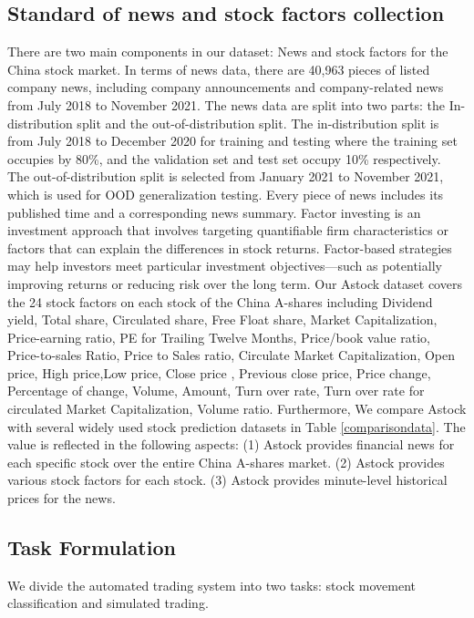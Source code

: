 \documentclass{article}
\begin{document}
\subsection{Standard of news and stock factors collection}
\label{factorrr}
There are two main components in our dataset: News and stock factors for the China stock market. In terms of news data, there are 40,963 pieces of listed company news, including company announcements and company-related news from July 2018 to November 2021. The news data are split into two parts: the In-distribution split and the out-of-distribution split. The in-distribution split is from July 2018 to December 2020 for training and testing where the training set occupies by 80\%, and the validation set and test set occupy 10\% respectively. The out-of-distribution split is selected from January 2021 to November 2021, which is used for OOD generalization testing. Every piece of news includes its published time and a corresponding news summary. Factor investing is an investment approach that involves targeting quantifiable firm characteristics or factors that can explain the differences in stock returns. 
Factor-based strategies may help investors
meet particular investment objectives—such as
potentially improving returns or reducing risk
over the long term. Our Astock dataset covers the 24 stock factors on each stock of the China A-shares including  Dividend yield, Total share, Circulated share, Free Float share, Market Capitalization, Price-earning ratio, PE for Trailing Twelve Months, Price/book value ratio, Price-to-sales Ratio, Price to Sales ratio, Circulate Market Capitalization, Open price, High price,Low price, Close price , Previous close price, Price change, Percentage of change, Volume, Amount, Turn over rate, Turn over rate for circulated Market Capitalization, Volume ratio. Furthermore, We compare Astock with several widely used stock prediction datasets in Table \ref{comparisondata}. The value is reflected in the following aspects: (1) Astock provides financial news for each specific stock over the entire China A-shares market. (2) Astock provides various stock factors for each stock. (3) Astock provides minute-level historical prices for the news.
\label{traindate}

\subsection{Task Formulation}
 We divide the automated trading system into two tasks: stock movement classification and simulated trading.
\end{document}
